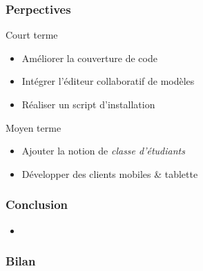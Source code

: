 \documentclass[t, english]{beamer}
\begin{document}
\begin{frame}[c]
  \frametitle{Perpectives}
  \begin{block}{Court terme}
    \begin{itemize}
      \item Améliorer la couverture de code
      \item Intégrer l'éditeur collaboratif de modèles
      \item Réaliser un script d'installation
    \end{itemize}
  \end{block}

  \vfill

  \begin{block}{Moyen terme}
    \begin{itemize}
      \item Ajouter la notion de \emph{classe d'étudiants}
      \item Développer des clients mobiles \& tablette
    \end{itemize}
  \end{block}
\end{frame}

\begin{frame}[c]
  \frametitle{Conclusion}
  \begin{itemize}
    \item 
  \end{itemize}
\end{frame}

\begin{frame}[c]
  \frametitle{Bilan}
%  
%  	
%             
%   
%  
%    
\end{frame}
\end{document}
